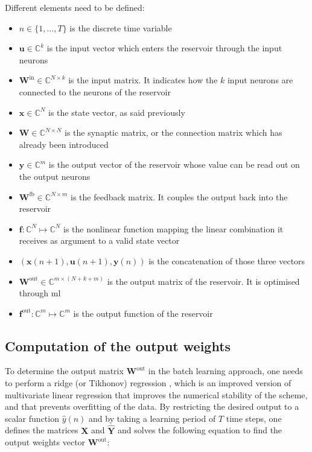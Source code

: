 Different elements need to be defined: 

\begin{itemize}
	\item $n \in \{1, \dots, T\}$ is the discrete time variable
	\item $\mathbf{u} \in \mathbb{C}^k$ is the input vector which enters the reservoir through the input neurons
	\item $\mathbf{W}^{\text{in}} \in \mathbb{C}^{N \times k}$ is the input matrix. It indicates how the $k$ input neurons are connected to the neurons of the reservoir
	\item $\mathbf{x} \in \mathbb{C}^{N}$ is the state vector, as said previously
	\item $\mathbf{W} \in \mathbb{C}^{N \times N}$ is the synaptic matrix, or the connection matrix which has already been introduced
	\item $\mathbf{y} \in \mathbb{C}^{m}$ is the output vector of the reservoir whose value can be read out on the output neurons
	\item $\mathbf{W}^{\text{fb}} \in \mathbb{C}^{N \times m}$ is the feedback matrix. It couples the output back into the reservoir
	\item $\mathbf{f}: \mathbb{C}^N \mapsto \mathbb{C}^N$ is the nonlinear function mapping the linear combination it receives as argument to a valid state vector
	\item $\left(\mathbf{x}(n+1), \mathbf{u}(n+1), \mathbf{y}(n)\right)$ is the concatenation of those three vectors
	\item $\mathbf{W}^{\text{out}} \in \mathbb{C}^{m \times (N+k+m)}$ is the output matrix of the reservoir. It is optimised through \gls{ml}
	\item $\mathbf{f}^{\text{out}} : \mathbb{C}^{m} \mapsto \mathbb{C}^{m}$ is the output function of the reservoir
\end{itemize}


\subsection{Computation of the output weights}

\label{subsec-rc-training}

To determine the output matrix $\mathbf{W}^{\text{out}}$ in the batch learning approach, one needs to perform a ridge (or Tikhonov) regression \cite{NIPS2010_4056}, which is an improved version of multivariate linear regression that improves the numerical stability of the scheme, and that prevents overfitting of the data. By restricting the desired output to a scalar function $\hat{y}(n)$ and by taking a learning period of $T$ time steps, one defines the matrices $\mathbf{X}$ and $\hat{\mathbf{Y}}$ and solves the following equation to find the output weights vector $\mathbf{W}^{\text{out}}$:

